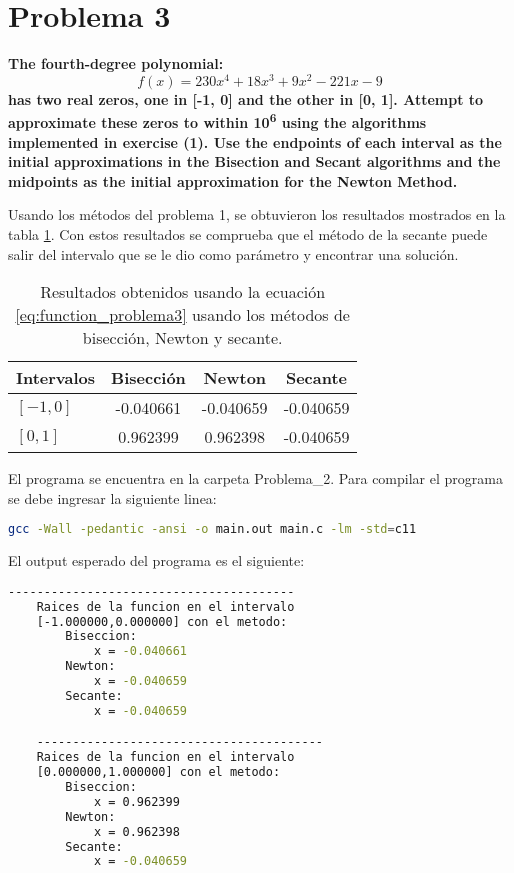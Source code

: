 \section*{Problema 3}
\textbf{The fourth-degree polynomial:}
\begin{equation}
    f(x)= 230x^4+18x^3+9x^2-221x-9
    \label{eq:function_problema3}
\end{equation}
\textbf{has two real zeros, one in [-1, 0] and the other in [0, 1]. Attempt to approximate these zeros to within 10\textsuperscript{6} using the algorithms implemented in exercise (1). Use the endpoints of each interval as the initial approximations in the Bisection and Secant algorithms and the midpoints as the initial approximation for the Newton Method.}

Usando los métodos del problema 1, se obtuvieron los resultados mostrados en la tabla \ref{table:results_problema3}. Con estos resultados se comprueba que el método de la secante puede salir del intervalo que se le dio como parámetro y encontrar una solución.
\begin{table}[H]
    \centering
    \begin{tabular}{lccc}
        \hline
        \textbf{Intervalos} & \textbf{Bisección} & \textbf{Newton} & \textbf{Secante} \\ \hline
        $[-1,0]$            & -0.040661          & -0.040659       & -0.040659        \\
        $[0,1]$             & 0.962399           & 0.962398        & -0.040659        \\ \hline
    \end{tabular}
    \caption{Resultados obtenidos usando la ecuación \ref{eq:function_problema3} usando los métodos de bisección, Newton y secante.}
    \label{table:results_problema3}
\end{table}

El programa se encuentra en la carpeta \textcolor{citecolor}{Problema\_2}. Para compilar el programa se debe ingresar la siguiente linea:

\begin{lstlisting}[language=bash]
    gcc -Wall -pedantic -ansi -o main.out main.c -lm -std=c11
\end{lstlisting}

El output esperado del programa es el siguiente:
\begin{lstlisting}[language=bash]
    ----------------------------------------
    Raices de la funcion en el intervalo
    [-1.000000,0.000000] con el metodo:
        Biseccion:
            x = -0.040661
        Newton:
            x = -0.040659
        Secante:
            x = -0.040659

    ----------------------------------------
    Raices de la funcion en el intervalo
    [0.000000,1.000000] con el metodo:
        Biseccion:
            x = 0.962399
        Newton:
            x = 0.962398
        Secante:
            x = -0.040659
\end{lstlisting}